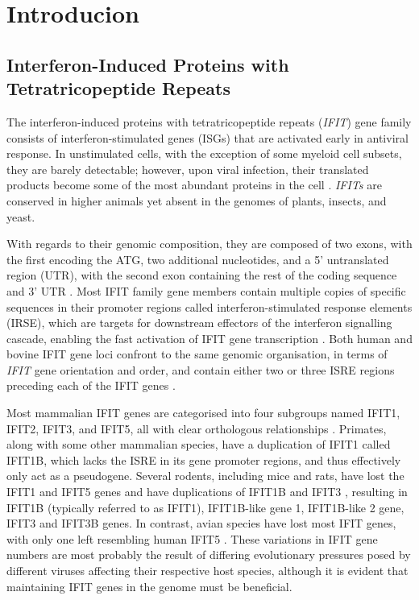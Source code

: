 \chapter{Introducion} \label{ch:Introduction}
\section{Interferon-Induced Proteins with Tetratricopeptide Repeats} \label{sec:Interferon-Induced Proteins with Tetratricopeptide Repeats}
The interferon-induced proteins with tetratricopeptide repeats (\textit{IFIT}) gene family consists of interferon-stimulated genes (ISGs) that are activated early in antiviral response. In unstimulated cells, with the exception of some myeloid cell subsets, they are barely detectable; however, upon viral infection, their translated products become some of the most abundant proteins in the cell \cite{Diamond2013TheProteins}. \textit{IFITs} are conserved in higher animals yet absent in the genomes of plants, insects, and yeast. 

With regards to their genomic composition, they are composed of two exons, with the first encoding the ATG, two additional nucleotides, and a 5' untranslated region (UTR), with the second exon containing the rest of the coding sequence and 3' UTR \cite{deVeer1998IFI60/ISG60/IFIT4Genes}. Most IFIT family gene members contain multiple copies of specific sequences in their promoter regions called interferon-stimulated response elements (IRSE), which are targets for downstream effectors of the interferon signalling cascade, enabling the fast activation of IFIT gene transcription \cite{Lou2009IFR-9/STAT2STAT1}. Both human and bovine IFIT gene loci confront to the same genomic organisation, in terms of \textit{IFIT} gene orientation and order, and contain either two or three ISRE regions preceding each of the IFIT genes \cite{Liu2013Lineage-SpecificFamily}.

Most mammalian IFIT genes are categorised into four subgroups named IFIT1, IFIT2, IFIT3, and IFIT5, all with clear orthologous relationships \cite{Sarkar2004NovelGenes}. Primates, along with some other mammalian species, have a duplication of IFIT1 called IFIT1B, which lacks the ISRE in its gene promoter regions, and thus effectively only act as a pseudogene. Several rodents, including mice and rats, have lost the IFIT1 and IFIT5 genes and have duplications of IFIT1B and IFIT3 \cite{Daugherty2016Evolution-guidedMammals.}, resulting in IFIT1B (typically referred to as IFIT1), IFIT1B-like gene 1, IFIT1B-like 2 gene, IFIT3 and IFIT3B genes. In contrast, avian species have lost most IFIT genes, with only one left resembling human IFIT5 \cite{Liu2013Lineage-SpecificFamily}. These variations in IFIT gene numbers are most probably the result of differing evolutionary pressures posed by different viruses affecting their respective host species, although it is evident that maintaining IFIT genes in the genome must be beneficial. 

